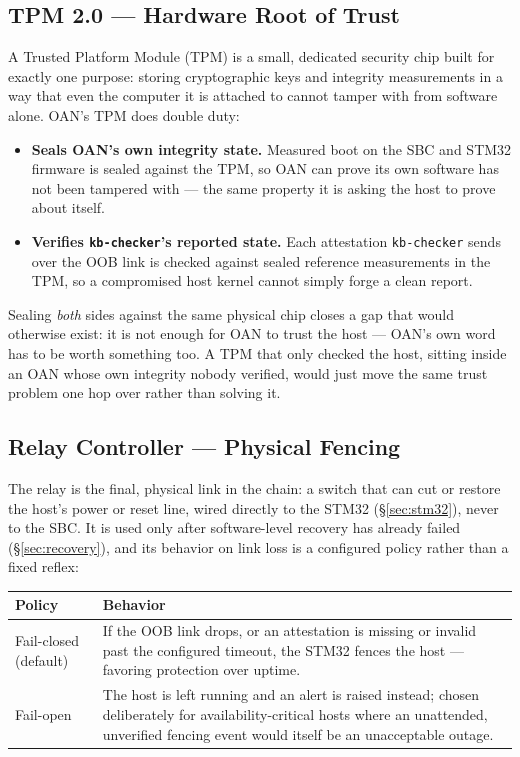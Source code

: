 \documentclass[11pt,a4paper]{article}
\begin{document}
\subsection{TPM 2.0 --- Hardware Root of Trust}

A Trusted Platform Module (TPM) is a small, dedicated security chip
built for exactly one purpose: storing cryptographic keys and integrity
measurements in a way that even the computer it is attached to cannot
tamper with from software alone. OAN's TPM does double duty:

\begin{itemize}
  \item \textbf{Seals OAN's own integrity state.} Measured boot on the
    SBC and STM32 firmware is sealed against the TPM, so OAN can prove
    its own software has not been tampered with --- the same property
    it is asking the host to prove about itself.
  \item \textbf{Verifies \texttt{kb-checker}'s reported state.} Each
    attestation \texttt{kb-checker} sends over the OOB link is checked
    against sealed reference measurements in the TPM, so a compromised
    host kernel cannot simply forge a clean report.
\end{itemize}

\begin{plainbox}
Sealing \emph{both} sides against the same physical chip closes a gap
that would otherwise exist: it is not enough for OAN to trust the host
--- OAN's own word has to be worth something too. A TPM that only
checked the host, sitting inside an OAN whose own integrity nobody
verified, would just move the same trust problem one hop over rather
than solving it.
\end{plainbox}

\subsection{Relay Controller --- Physical Fencing}

The relay is the final, physical link in the chain: a switch that can
cut or restore the host's power or reset line, wired directly to the
STM32 (\S\ref{sec:stm32}), never to the SBC. It is used only after
software-level recovery has already failed (\S\ref{sec:recovery}), and
its behavior on link loss is a configured policy rather than a fixed
reflex:

\begin{center}
\renewcommand{\arraystretch}{1.3}
\begin{tabular}{@{}p{3.4cm}p{10.3cm}@{}}
\toprule
\textbf{Policy} & \textbf{Behavior} \\
\midrule
Fail-closed (default) & If the OOB link drops, or an attestation is
missing or invalid past the configured timeout, the STM32 fences the
host --- favoring protection over uptime. \\
Fail-open & The host is left running and an alert is raised instead;
chosen deliberately for availability-critical hosts where an
unattended, unverified fencing event would itself be an unacceptable
outage. \\
\bottomrule
\end{tabular}
\end{center}
\end{document}
